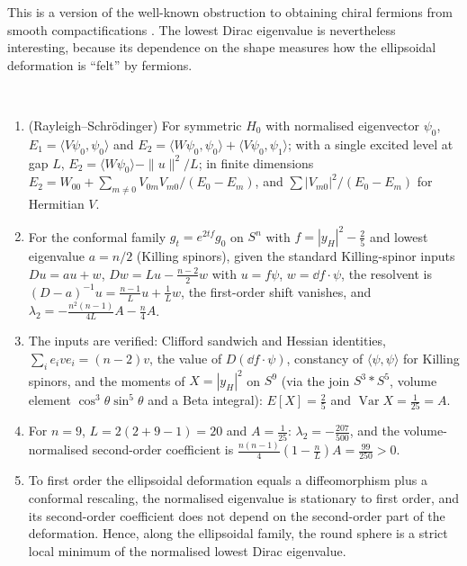 This is a version of the well-known obstruction to obtaining chiral fermions from smooth compactifications \cite{Witten1981}. The lowest Dirac eigenvalue is nevertheless interesting, because its dependence on the shape measures how the ellipsoidal deformation is ``felt'' by fermions.

\begin{theorem}\label{thm:s9pert}\ver\
\begin{enumerate}[label=(\roman*)]
\item (Rayleigh--Schr\"odinger) For symmetric $H_0$ with normalised eigenvector $\psi_0$, $E_1=\langle V\psi_0,\psi_0\rangle$ and $E_2=\langle W\psi_0,\psi_0\rangle+\langle V\psi_0,\psi_1\rangle$; with a single excited level at gap $L$, $E_2=\langle W\psi_0\rangle-\|u\|^2/L$; in finite dimensions $E_2=W_{00}+\sum_{m\ne0}V_{0m}V_{m0}/(E_0-E_m)$, and $\sum|V_{m0}|^2/(E_0-E_m)$ for Hermitian $V$.
\item For the conformal family $g_t=e^{2tf}g_0$ on $S^n$ with $f=|y_H|^2-\frac25$ and lowest eigenvalue $a=n/2$ (Killing spinors), given the standard Killing-spinor inputs $Du=au+w$, $Dw=Lu-\frac{n-2}2w$ with $u=f\psi$, $w=\dd f\cdot\psi$, the resolvent is $(D-a)^{-1}u=\frac{n-1}Lu+\frac1Lw$, the first-order shift vanishes, and $\lambda_2=-\frac{n^2(n-1)}{4L}A-\frac n4A$.
\item The inputs are verified: Clifford sandwich and Hessian identities, $\sum_ie_ive_i=(n-2)v$, the value of $D(\dd f\cdot\psi)$, constancy of $\langle\psi,\psi\rangle$ for Killing spinors, and the moments of $X=|y_H|^2$ on $S^9$ (via the join $S^3*S^5$, volume element $\cos^3\theta\sin^5\theta$ and a Beta integral): $E[X]=\frac25$ and $\operatorname{Var}X=\frac1{25}=A$.
\item For $n=9$, $L=2(2+9-1)=20$ and $A=\frac1{25}$: $\lambda_2=-\frac{207}{500}$, and the volume-normalised second-order coefficient is $\frac{n(n-1)}4(1-\frac nL)A=\frac{99}{250}>0$.
\item To first order the ellipsoidal deformation equals a diffeomorphism plus a conformal rescaling, the normalised eigenvalue is stationary to first order, and its second-order coefficient does not depend on the second-order part of the deformation. Hence, along the ellipsoidal family, the round sphere is a strict local minimum of the normalised lowest Dirac eigenvalue.
\end{enumerate}
\end{theorem}
